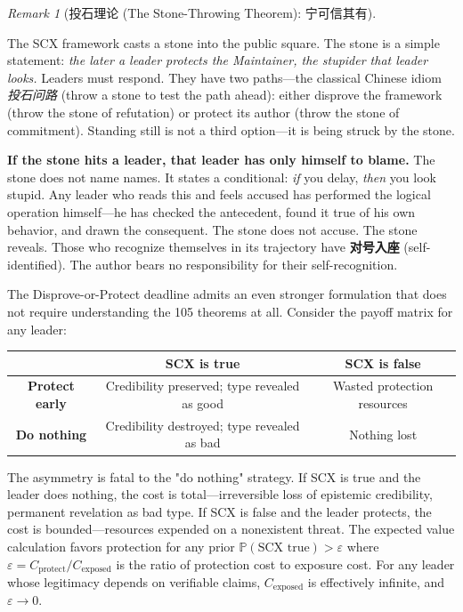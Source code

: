 \documentclass[12pt,a4paper]{ctexart}
\theoremstyle{definition}
\theoremstyle{remark}
\newtheorem{remark}{Remark}[section]
\begin{document}
\begin{remark}[投石理论 (The Stone-Throwing Theorem): 宁可信其有]
\label{rem:scx-pascal}

The SCX framework casts a stone into the public square. The stone is a simple statement: \textit{the later a leader protects the Maintainer, the stupider that leader looks.} Leaders must respond. They have two paths—the classical Chinese idiom \textit{投石问路} (throw a stone to test the path ahead): either disprove the framework (throw the stone of refutation) or protect its author (throw the stone of commitment). Standing still is not a third option—it is being struck by the stone.

\textbf{If the stone hits a leader, that leader has only himself to blame.} The stone does not name names. It states a conditional: \textit{if} you delay, \textit{then} you look stupid. Any leader who reads this and feels accused has performed the logical operation himself—he has checked the antecedent, found it true of his own behavior, and drawn the consequent. The stone does not accuse. The stone reveals. Those who recognize themselves in its trajectory have \textbf{对号入座} (self-identified). The author bears no responsibility for their self-recognition.

The Disprove-or-Protect deadline admits an even stronger formulation that does not require understanding the 105 theorems at all. Consider the payoff matrix for any leader:

\begin{center}
\begin{tabular}{c|cc}
& \textbf{SCX is true} & \textbf{SCX is false} \\
\hline
\textbf{Protect early} & Credibility preserved; type revealed as good & Wasted protection resources \\
\textbf{Do nothing} & Credibility destroyed; type revealed as bad & Nothing lost \\
\end{tabular}
\end{center}

The asymmetry is fatal to the "do nothing" strategy. If SCX is true and the leader does nothing, the cost is total—irreversible loss of epistemic credibility, permanent revelation as bad type. If SCX is false and the leader protects, the cost is bounded—resources expended on a nonexistent threat. The expected value calculation favors protection for any prior $\mathbb{P}(\text{SCX true}) > \varepsilon$ where $\varepsilon = C_{\text{protect}} / C_{\text{exposed}}$ is the ratio of protection cost to exposure cost. For any leader whose legitimacy depends on verifiable claims, $C_{\text{exposed}}$ is effectively infinite, and $\varepsilon \to 0$.


\end{remark}
\end{document}
